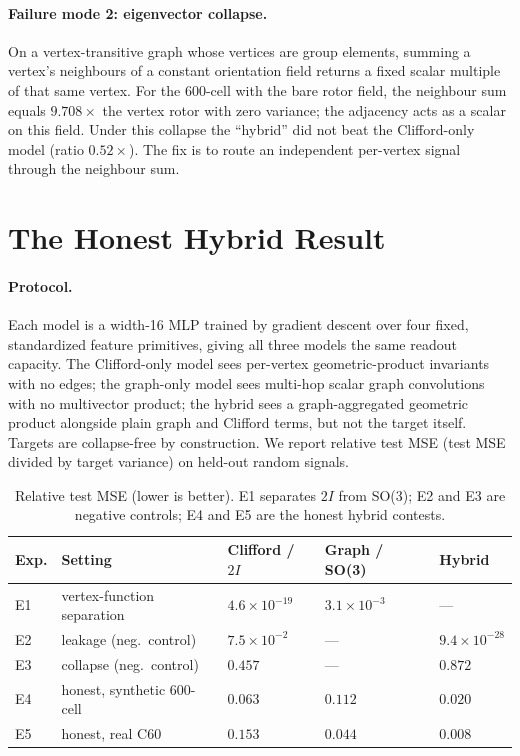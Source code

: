 \documentclass[10pt]{article}
\begin{document}
\paragraph{Failure mode 2: eigenvector collapse.}
On a vertex-transitive graph whose vertices are group elements, summing a vertex's neighbours of a constant orientation field returns a fixed scalar multiple of that same vertex.
For the 600-cell with the bare rotor field, the neighbour sum equals $9.708\times$ the vertex rotor with zero variance; the adjacency acts as a scalar on this field.
Under this collapse the ``hybrid'' did not beat the Clifford-only model (ratio $0.52\times$).
The fix is to route an independent per-vertex signal through the neighbour sum.

\section{The Honest Hybrid Result}
\label{sec:honest}

\paragraph{Protocol.}
Each model is a width-16 MLP trained by gradient descent over four fixed, standardized feature primitives, giving all three models the same readout capacity.
The Clifford-only model sees per-vertex geometric-product invariants with no edges; the graph-only model sees multi-hop scalar graph convolutions with no multivector product; the hybrid sees a graph-aggregated geometric product alongside plain graph and Clifford terms, but not the target itself.
Targets are collapse-free by construction.
We report relative test MSE (test MSE divided by target variance) on held-out random signals.

\begin{table}[h]
\centering
\caption{Relative test MSE (lower is better). E1 separates $2I$ from SO(3); E2 and E3 are negative controls; E4 and E5 are the honest hybrid contests.}
\begin{tabular}{lllll}
\toprule
Exp. & Setting & Clifford / $2I$ & Graph / SO(3) & Hybrid \\
\midrule
E1 & vertex-function separation & $4.6\times 10^{-19}$ & $3.1\times 10^{-3}$ & --- \\
E2 & leakage (neg.\ control) & $7.5\times 10^{-2}$ & --- & $9.4\times 10^{-28}$ \\
E3 & collapse (neg.\ control) & $0.457$ & --- & $0.872$ \\
E4 & honest, synthetic 600-cell & $0.063$ & $0.112$ & $\mathbf{0.020}$ \\
E5 & honest, real C60 & $0.153$ & $0.044$ & $\mathbf{0.008}$ \\
\bottomrule
\end{tabular}
\end{table}
\end{document}
